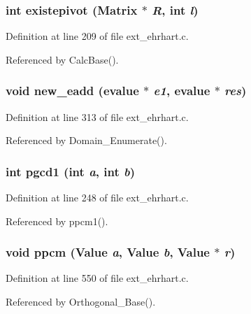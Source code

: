 \subsubsection{\setlength{\rightskip}{0pt plus 5cm}int existepivot (Matrix $\ast$ {\em R}, int {\em l})\hspace{0.3cm}{\tt  [static]}}\label{ext__ehrhart_8c_a5}




Definition at line 209 of file ext\_\-ehrhart.c.

Referenced by Calc\-Base().

\subsubsection{\setlength{\rightskip}{0pt plus 5cm}void new\_\-eadd (evalue $\ast$ {\em e1}, evalue $\ast$ {\em res})}\label{ext__ehrhart_8c_a8}




Definition at line 313 of file ext\_\-ehrhart.c.

Referenced by Domain\_\-Enumerate().

\subsubsection{\setlength{\rightskip}{0pt plus 5cm}int pgcd1 (int {\em a}, int {\em b})}\label{ext__ehrhart_8c_a7}




Definition at line 248 of file ext\_\-ehrhart.c.

Referenced by ppcm1().

\subsubsection{\setlength{\rightskip}{0pt plus 5cm}void ppcm (Value {\em a}, Value {\em b}, Value $\ast$ {\em r})}\label{ext__ehrhart_8c_a11}




Definition at line 550 of file ext\_\-ehrhart.c.

Referenced by Orthogonal\_\-Base().


